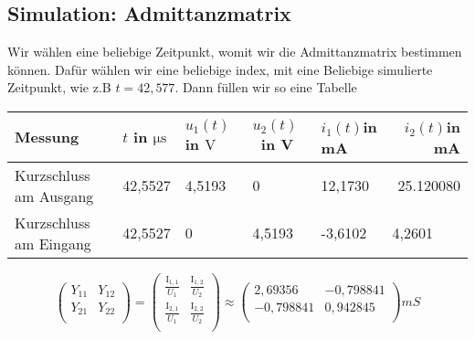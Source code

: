 \subsection{Simulation: Admittanzmatrix}
\label{subsec:4_simulation}
%
%
Wir wählen eine beliebige Zeitpunkt, womit wir die Admittanzmatrix bestimmen können. Dafür wählen wir eine beliebige index, mit eine Beliebige simulierte Zeitpunkt, wie z.B $t=42,577$.
Dann füllen wir so eine Tabelle
\begin{table}[H]
\begin{tabular}{l|lll|lr} 
\toprule
Messung & $t$ in $\si{\micro\second}$ & $u_1(t)$ in $\si{\volt}$ & \textcolor[rgb]{0,0.102,0.118}{\textbf{\textbf{$u_2(t)$~}}}\textcolor[rgb]{0,0.102,0.118}{\textbf{\textbf{in V}}} & \textcolor[rgb]{0,0.102,0.118}{}$i_1(t) $\textcolor[rgb]{0,0.102,0.118}{in mA} & $i_2(t)$\textcolor[rgb]{0,0.102,0.118}{in mA}  \\ 
\hline 
\textcolor[rgb]{0,0.102,0.118}{Kurzschluss am Ausgang} & 42{,}5527                                                                                                                                                                          & 4{,}5193                                                                                         & 0                                                                                                                 & 12,1730                                                                        & 25.120080                                      \\
\textcolor[rgb]{0,0.102,0.118}{Kurzschluss am Eingang} & 42,5527                                                                                                                                                                          & 0                                                                                              & 4,5193                                                                                                            & -3,6102                                                                        & \multicolumn{1}{l}{4,2601}                     \\
\bottomrule
\end{tabular}
\end{table}
%
\[
 \left(
\begin{array}{cc}
 Y_{11} & Y_{12} \\
 Y_{21} & Y_{22} \\
\end{array}
\right)=\left(
\begin{array}{cc}
 \frac{\text{I}_{1,1}}{U_{1}} & \frac{\text{I}_{1,2}}{U_{2}} \\
 \frac{\text{I}_{2,1}}{U_{1}} & \frac{\text{I}_{2,2}}{U_{2}} \\
\end{array}
\right)\approx \left(
\begin{array}{cc}
2,69356 & -0,798841 \\
 -0,798841 & 0,942845 \\
\end{array}
\right) mS 
\]
\begin{flushright}
\textit{\autorA}
\end{flushright}
%
%
%
%